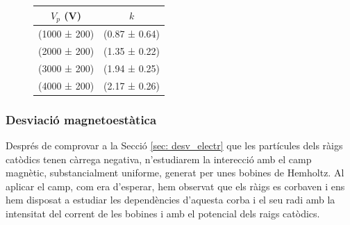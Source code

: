 \documentclass[11pt]{article}
\numberwithin{equation}{section}
\numberwithin{figure}{section}
\numberwithin{table}{section}
\begin{document}
\begin{figure}[h]
    \centering
    \begin{minipage}{0.45\textwidth} 
        \centering
        \begin{tabular}{|c|c|}
            \hline
            $V_p$ (V)	&	$k$	\\\hline
            (1000 ± 200)	&	(0.87 ± 0.64)   \\\hline
            (2000 ± 200)	&	(1.35 ± 0.22)	\\\hline
            (3000 ± 200)	&	(1.94 ± 0.25)	\\\hline
            (4000 ± 200)	&	(2.17 ± 0.26)	\\\hline           
        \end{tabular}
        \label{tab:kvsVp}
    \end{minipage}
\end{figure}


\subsubsection{Desviació magnetoestàtica}\label{sec: desv_magn}
Després de comprovar a la Secció \ref{sec: desv_electr} que les partícules dels ràigs catòdics tenen càrrega negativa, n'estudiarem la interecció amb el camp magnètic, substancialment uniforme, generat per unes bobines de Hemholtz. 
Al aplicar el camp, com era d'esperar, hem observat que els ràigs es corbaven i ens hem disposat a estudiar les dependències d'aquesta corba i el seu radi amb la intensitat del corrent de les bobines i amb el potencial dels raigs catòdics.
\end{document}
